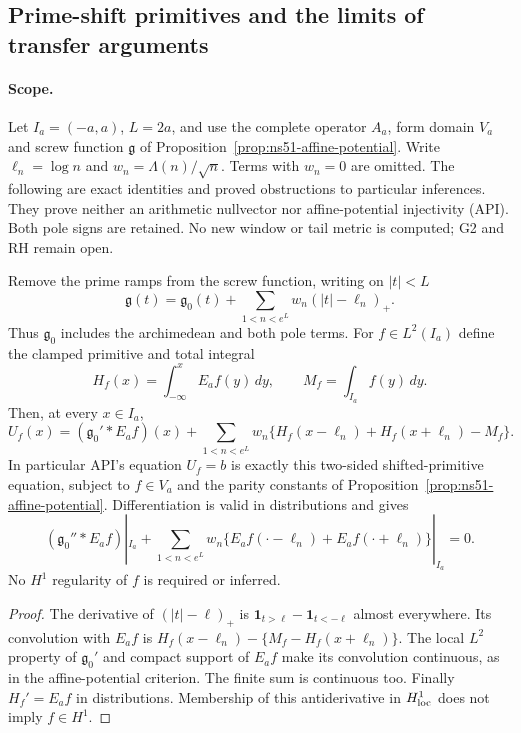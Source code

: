 \subsection*{Prime-shift primitives and the limits of transfer arguments}

\paragraph{Scope.}
Let $I_a=(-a,a)$, $L=2a$, and use the complete operator $A_a$,
form domain $V_a$ and screw function $\mathfrak g$ of
Proposition~\ref{prop:ns51-affine-potential}. Write
$\ell_n=\log n$ and $w_n=\Lambda(n)/\sqrt n$. Terms with
$w_n=0$ are omitted. The following are exact identities and proved
obstructions to particular inferences. They prove neither an arithmetic
nullvector nor affine-potential injectivity (API). Both pole signs are
retained. No new window or tail metric is computed; G2 and RH remain open.

\begin{proposition}
\label{prop:ns55-prime-primitives}
Remove the prime ramps from the screw function, writing on $|t|<L$
\[
 \mathfrak g(t)=\mathfrak g_0(t)+
       \sum_{1<n<e^L}w_n(|t|-\ell_n)_+.
\]
Thus $\mathfrak g_0$ includes the archimedean and both pole terms.
For $f\in L^2(I_a)$ define the clamped primitive and total integral
\[
 H_f(x)=\int_{-\infty}^x E_af(y)\,dy,
 \qquad M_f=\int_{I_a}f(y)\,dy.
\]
Then, at every $x\in I_a$,
\begin{equation}\label{eq:ns55-prime-primitive}
 U_f(x)=(\mathfrak g_0'*E_af)(x)+
 \sum_{1<n<e^L}w_n
       \{H_f(x-\ell_n)+H_f(x+\ell_n)-M_f\}.
\end{equation}
In particular API's equation $U_f=b$ is exactly this two-sided
shifted-primitive equation, subject to $f\in V_a$ and the parity constants
of Proposition~\ref{prop:ns51-affine-potential}. Differentiation is valid
in distributions and gives
\begin{equation}\label{eq:ns55-prime-differentiated}
 (\mathfrak g_0''*E_af)|_{I_a}
 +\sum_{1<n<e^L}w_n\{E_af(\cdot-\ell_n)+E_af(\cdot+\ell_n)\}|_{I_a}=0.
\end{equation}
No $H^1$ regularity of $f$ is required or inferred.
\end{proposition}
\begin{proof}
The derivative of $(|t|-\ell)_+$ is
$\mathbf1_{t>\ell}-\mathbf1_{t<-\ell}$ almost everywhere. Its
convolution with $E_af$ is
$H_f(x-\ell_n)-\{M_f-H_f(x+\ell_n)\}$.
The local $L^2$ property of $\mathfrak g_0'$ and compact support of
$E_af$ make its convolution continuous, as in the affine-potential
criterion. The finite sum is continuous too. Finally
$H_f'=E_af$ in distributions. Membership of this antiderivative in
$H^1_{\rm loc}$ does not imply $f\in H^1$.
\end{proof}

